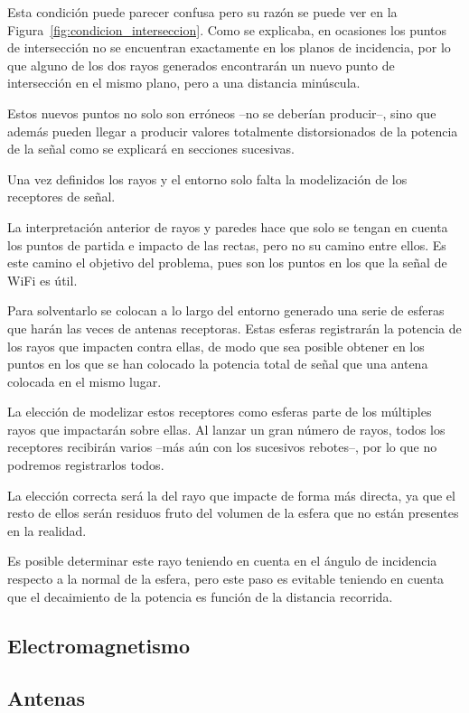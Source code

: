 Esta condición puede parecer confusa pero su razón se puede ver en la Figura~\ref{fig:condicion_interseccion}.
Como se explicaba, en ocasiones los puntos de intersección no se encuentran exactamente en los planos de incidencia, por lo que alguno de los dos rayos generados encontrarán un nuevo punto de intersección en el mismo plano, pero a una distancia minúscula.

Estos nuevos puntos no solo son erróneos --no se deberían producir--, sino que además pueden llegar a producir valores totalmente distorsionados de la potencia de la señal como se explicará en secciones sucesivas.

\vspace*{2cm}

Una vez definidos los rayos y el entorno solo falta la modelización de los receptores de señal.

La interpretación anterior de rayos y paredes hace que solo se tengan en cuenta los puntos de partida e impacto de las rectas, pero no su camino entre ellos.
Es este camino el objetivo del problema, pues son los puntos en los que la señal de WiFi es útil.

Para solventarlo se colocan a lo largo del entorno generado una serie de esferas que harán las veces de antenas receptoras.
Estas esferas registrarán la potencia de los rayos que impacten contra ellas, de modo que sea posible obtener en los puntos en los que se han colocado la potencia total de señal que una antena colocada en el mismo lugar.

La elección de modelizar estos receptores como esferas parte de los múltiples rayos que impactarán sobre ellas.
Al lanzar un gran número de rayos, todos los receptores recibirán varios --más aún con los sucesivos rebotes--, por lo que no podremos registrarlos todos.

La elección correcta será la del rayo que impacte de forma más directa, ya que el resto de ellos serán residuos fruto del volumen de la esfera que no están presentes en la realidad.

Es posible determinar este rayo teniendo en cuenta en el ángulo de incidencia respecto a la normal de la esfera, pero este paso es evitable teniendo en cuenta que el decaimiento de la potencia es función de la distancia recorrida.

\subsection{Electromagnetismo}

\subsection{Antenas}

